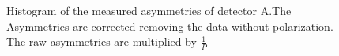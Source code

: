 \begin{figure}[!ht]
\caption{Histogram of the measured asymmetries of detector A.The Asymmetries are corrected removing the data without polarization. The raw asymmetries are multiplied by $\frac{1}{P}$}
\label{fig:AsymmtriesA0A1A2A3}
\end{figure}

